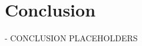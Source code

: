 \chapter{Conclusion}\label{ch:conclusion}


\begin{tcolorbox}[colback=orange]
- CONCLUSION PLACEHOLDERS

\end{tcolorbox}
